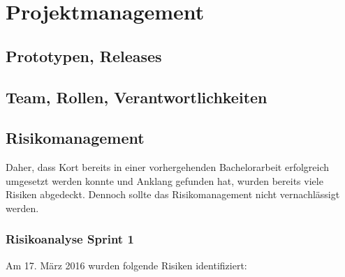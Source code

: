 \chapter{Projektmanagement}
\label{pm-projektmanagement}

\section{Prototypen, Releases}


\section{Team, Rollen, Verantwortlichkeiten}


\section{Risikomanagement}
Daher, dass  Kort bereits in einer vorhergehenden Bachelorarbeit erfolgreich umgesetzt werden konnte und Anklang gefunden hat, wurden bereits viele Risiken abgedeckt.\newline
Dennoch sollte das Risikomanagement nicht vernachlässigt werden.

\subsection{Risikoanalyse Sprint 1}
Am 17. März 2016 wurden folgende Risiken identifiziert:

